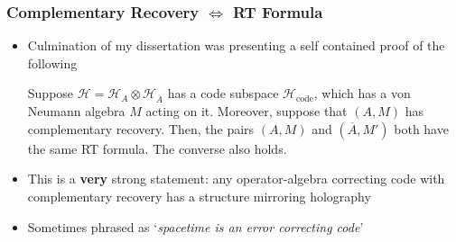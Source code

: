 \documentclass[11pt]{beamer}
\begin{document}

	\begin{frame}
		\frametitle{Complementary Recovery $\iff$ RT Formula}
		\begin{itemize}[<+->]
			\item Culmination of my dissertation was presenting a self contained proof of the following
			\begin{theorem}
				Suppose $\mathcal{H}=\mathcal{H}_{A}\otimes\mathcal{H}_{\overline{A}}$ has a code subspace $\mathcal{H}_{\text{code}}$, which has a von Neumann algebra $M$ acting on it. Moreover, suppose that $(A,M)$ has complementary recovery. Then, the pairs $(A,M)$ and $(\overline{A},M')$ both have the same RT formula. The converse also holds.
			\end{theorem}
			\item This is a \textbf{very} strong statement: any operator-algebra correcting code with complementary recovery has a structure mirroring holography
			\item Sometimes phrased as `\textit{spacetime is an error correcting code}'
		\end{itemize}
	\end{frame}
\end{document}

